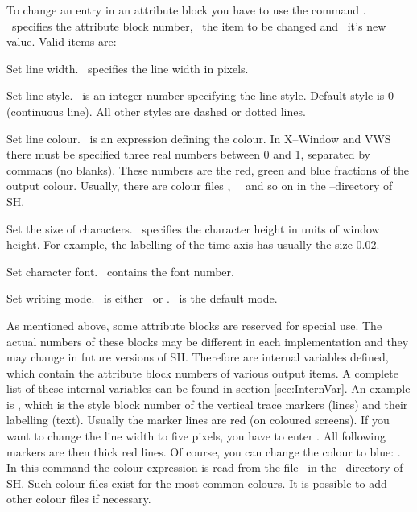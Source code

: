 To change an entry in an attribute block you have to use the
command .  \
specifies the attribute block number, \ the item to
be changed and \ it's new value.  Valid items are:
\begin{deflist}{}
\item[\exm{linewidth}]
   Set line width.  \ specifies the line width in
   pixels.
\item[\exm{linestyle}]
   Set line style.  \ is an integer number specifying
   the line style.  Default style is 0 (continuous line).  All
   other styles are dashed or dotted lines.
\item[\exm{color}]
   Set line colour.  \ is an expression defining the
   colour.  In X--Window and VWS there must be specified three
   real numbers between 0 and 1, separated by commans (no blanks).
   These numbers are the red, green and blue fractions of the
   output colour.  Usually, there are colour files ,
   \exm{YELLOW.STX}\, \exm{GREEN.STX}\ and so on in the
   --directory of SH.
\item[\exm{charsize}]
   Set the size of characters.  \ specifies the
   character height in units of window height.  For example, the
   labelling of the time axis has usually the size 0.02.
\item[\exm{font}]
   Set character font.  \ contains the font number.
\item[\exm{wrmode}]
   Set writing mode.  \ is either \ or
   \exm{xor}.  \exm{replace}\ is the default mode.
\end{deflist}

As mentioned above, some attribute blocks are reserved for special
use.  The actual numbers of these blocks may be different in each
implementation and they may change in future versions of SH.
Therefore are internal variables defined, which contain the attribute
block numbers of various output items.  A complete list of these
internal variables can be found in section \ref{sec:InternVar}.  An
example is \exm{\$markstyle}, which is the style block number of
the vertical trace markers (lines) and their labelling (text).
Usually the marker lines are red (on coloured screens).  If you
want to change the line width to five pixels, you have to enter
.  All following
markers are then thick red lines.  Of course, you can change
the colour to blue: .
In this command the colour expression is read from the file
\ in the \ directory of SH.  Such colour
files exist for the most common colours.  It is possible to
add other colour files if necessary.

